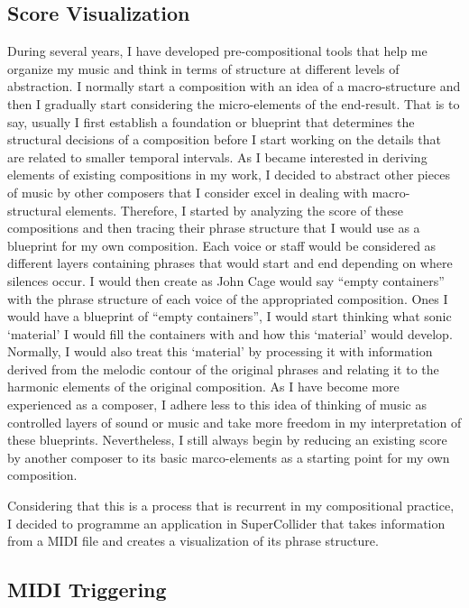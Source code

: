 \subsection{Score Visualization}

During several years, I have developed pre-compositional tools that help me organize my music and think in terms of structure at different levels of abstraction. I normally start a composition with an idea of a macro-structure and then I gradually start considering the micro-elements of the end-result. That is to say, usually I first establish a foundation or blueprint that determines the structural decisions of a composition before I start working on the details that are related to smaller temporal intervals. As I became interested in deriving elements of existing compositions in my work, I decided to abstract other pieces of music by other composers that I consider excel in dealing with macro-structural elements. Therefore, I started by analyzing the score of these compositions and then tracing their phrase structure that I would use as a blueprint for my own composition. Each voice or staff would be considered as different layers containing phrases that would start and end depending on where silences occur. I would then create as John Cage would say ``empty containers'' with the phrase structure of each voice of the appropriated composition. Ones I would have a blueprint of ``empty containers'', I would start thinking what sonic `material' I would fill the containers with and how this `material' would develop. Normally, I would also treat this `material' by processing it with information derived from the melodic contour of the original phrases and relating it to the harmonic elements of the original composition. As I have become more experienced as a composer, I adhere less to this idea of thinking of music as controlled layers of sound or music and take more freedom in my interpretation of these blueprints. Nevertheless, I still always begin by reducing an existing score by another composer to its basic marco-elements as a starting point for my own composition. 

Considering that this is a process that is recurrent in my compositional practice, I decided to programme an application in SuperCollider that takes information from a MIDI file and creates a visualization of its phrase structure.  


\subsection{MIDI Triggering}

\label{ch:compamp}